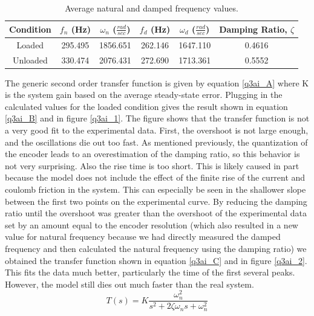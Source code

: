 \documentclass{article}
\theoremstyle{plain}
\theoremstyle{definition}
\theoremstyle{remark}
\begin{document}
\begin{table}[htb]
\begin{center}
    \begin{tabular}{|c|c|c|c|c|c|}
        \hline
        Condition & $f _n$ (Hz)  & $\omega _n$ ($\frac{rad}{sec}$) & $f _d$ (Hz) &  $\omega _d$ ($\frac{rad}{sec}$) & Damping Ratio, $\zeta$   \\ \hline
        Loaded   & 295.495   & 1856.651 & 262.146 &  1647.110 & 0.4616\\ 
        Unloaded   & 330.474   & 2076.431 & 272.690 & 1713.361 & 0.5552         \\         
        \hline
    \end{tabular}
\caption{Average natural and damped frequency values.}
\label{q3ai_@}
\end{center}
\end{table}

The generic second order transfer function is given by equation \ref{q3ai_A} where K is the system gain based on the average steady-state error. Plugging in the calculated values for the loaded condition gives the result shown in equation \ref{q3ai_B} and in figure \ref{q3ai_1}. The figure shows that the transfer function is not a very good fit to the experimental data. First, the overshoot is not large enough, and the oscillations die out too fast. As mentioned previously, the quantization of the encoder leads to an overestimation of the damping ratio, so this behavior is not very surprising. Also the rise time is too short. This is likely caused in part because the model does not include the effect of the finite rise of the current and coulomb friction in the system. This can especially be seen in the shallower slope between the first two points on the experimental curve. By reducing the damping ratio until the overshoot was greater than the overshoot of the experimental data set by an amount equal to the encoder resolution (which also resulted in a new value for natural frequency because we had directly measured the damped frequency and then calculated the natural frequency using the damping ratio) we obtained the transfer function shown in equation \ref{q3ai_C} and in figure \ref{q3ai_2}. This fits the data much better, particularly the time of the first several peaks. However, the model still dies out much faster than the real system.\\

\begin{equation}
\label{q3ai_A}
T(s) = K \frac{\omega _n^2}{s^2 + 2\zeta \omega _n s + \omega _n^2}
\end{equation}
\end{document}
